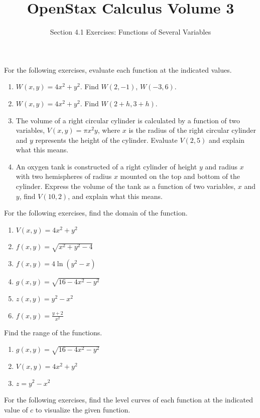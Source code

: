\documentclass{exercises}
\title{OpenStax Calculus Volume 3}
\subtitle{Section 4.1 Exercises: Functions of Several Variables}
\author{}
\date{}
\begin{document}
\maketitle


For the following exercises, evaluate each function at the indicated values.

\begin{enumerate}[start=1]
\item $W(x,y)=4x^{2}+y^{2}$. Find $W(2,-1)$, $W(-3,6)$.
\item $W(x,y)=4x^{2}+y^{2}$. Find $W(2+h,3+h)$.
\item The volume of a right circular cylinder is calculated by a function of two variables, $V(x,y)=\pi x^{2}y$, where $x$ is the radius of the right circular cylinder and $y$ represents the height of the cylinder. Evaluate $V(2,5)$ and explain what this means.
\item An oxygen tank is constructed of a right cylinder of height $y$ and radius $x$ with two hemispheres of radius $x$ mounted on the top and bottom of the cylinder. Express the volume of the tank as a function of two variables, $x$ and $y$, find $V(10,2)$, and explain what this means.
\end{enumerate}

For the following exercises, find the domain of the function.

\begin{enumerate}[resume]
\item $V(x,y)=4x^{2}+y^{2}$
\item $f(x,y)=\sqrt{x^{2}+y^{2}-4}$
\item $f(x,y)=4\ln(y^{2}-x)$
\item $g(x,y)=\sqrt{16-4x^{2}-y^{2}}$
\item $z(x,y)=y^{2}-x^{2}$
\item $f(x,y)=\frac{y+2}{x^{2}}$
\end{enumerate}

Find the range of the functions.

\begin{enumerate}[resume]
\item $g(x,y)=\sqrt{16-4x^{2}-y^{2}}$
\item $V(x,y)=4x^{2}+y^{2}$
\item $z=y^{2}-x^{2}$
\end{enumerate}

For the following exercises, find the level curves of each function at the indicated value of $c$ to visualize the given function.
\end{document}
